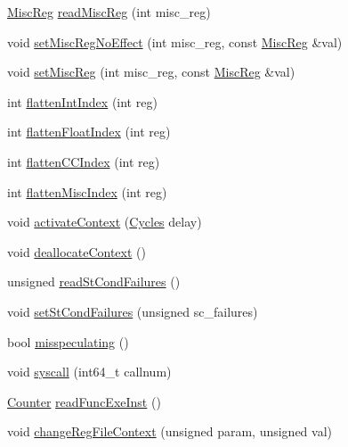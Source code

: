 \begin{DoxyCompactItemize}
\item 
\hyperlink{classThreadContext_aaf5f073a387db0556d1db4bcc45428bc}{MiscReg} \hyperlink{classInOrderThreadContext_a5a8c6c487e8da143d26188258b04f1cc}{readMiscReg} (int misc\_\-reg)
\item 
void \hyperlink{classInOrderThreadContext_a763517aaea2f3decbc1ef9d064216b6f}{setMiscRegNoEffect} (int misc\_\-reg, const \hyperlink{classThreadContext_aaf5f073a387db0556d1db4bcc45428bc}{MiscReg} \&val)
\item 
void \hyperlink{classInOrderThreadContext_a1877dde4f3eb17a8b7d33ea40176c148}{setMiscReg} (int misc\_\-reg, const \hyperlink{classThreadContext_aaf5f073a387db0556d1db4bcc45428bc}{MiscReg} \&val)
\item 
int \hyperlink{classInOrderThreadContext_aa529f2d70520c578e3e29b3bf1a66312}{flattenIntIndex} (int reg)
\item 
int \hyperlink{classInOrderThreadContext_ab9ea3f8f1a21df875c7273c7377dfac1}{flattenFloatIndex} (int reg)
\item 
int \hyperlink{classInOrderThreadContext_ac33d74353e36a595ec48962cd0446320}{flattenCCIndex} (int reg)
\item 
int \hyperlink{classInOrderThreadContext_a5adc7d32f3a8bd75c5dc0a62d95564fd}{flattenMiscIndex} (int reg)
\item 
void \hyperlink{classInOrderThreadContext_a4f6e340045c7344d26acbb6fbece544e}{activateContext} (\hyperlink{classCycles}{Cycles} delay)
\item 
void \hyperlink{classInOrderThreadContext_a84a8d5596f32e480e2d6d8199800bc91}{deallocateContext} ()
\item 
unsigned \hyperlink{classInOrderThreadContext_a25b995a791e41965e088d8bf3f2bf859}{readStCondFailures} ()
\item 
void \hyperlink{classInOrderThreadContext_abbe779fa43c72cd485ddb736ab17ff61}{setStCondFailures} (unsigned sc\_\-failures)
\item 
bool \hyperlink{classInOrderThreadContext_a99768639c728ee835cce54b8b42b3d8f}{misspeculating} ()
\item 
void \hyperlink{classInOrderThreadContext_a36e0b96120fcbbc2ee8699158f7be5c2}{syscall} (int64\_\-t callnum)
\item 
\hyperlink{base_2types_8hh_ae1475755791765b8e6f6a8bb091e273e}{Counter} \hyperlink{classInOrderThreadContext_a2b0bef6e1b1ac24e9322fbd09a511d11}{readFuncExeInst} ()
\item 
void \hyperlink{classInOrderThreadContext_a3f71438128bca2ddd412462483bf0f70}{changeRegFileContext} (unsigned param, unsigned val)

\end{DoxyCompactItemize}
